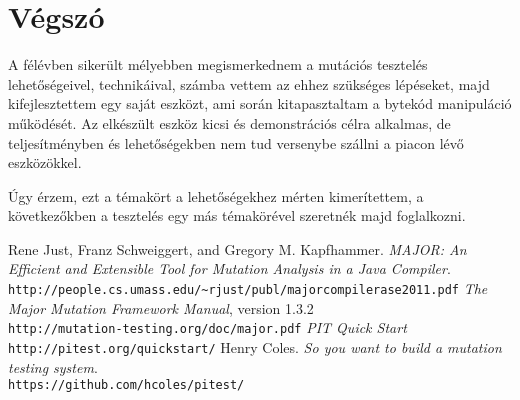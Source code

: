 \section{Végszó}
A félévben sikerült mélyebben megismerkednem a mutációs tesztelés lehetőségeivel, technikáival, számba vettem az ehhez szükséges lépéseket, majd kifejlesztettem egy saját eszközt, ami során kitapasztaltam a bytekód manipuláció működését. Az elkészült eszköz kicsi és demonstrációs célra alkalmas, de teljesítményben és lehetőségekben nem tud versenybe szállni a piacon lévő eszközökkel.

Úgy érzem, ezt a témakört a lehetőségekhez mérten kimerítettem, a következőkben a tesztelés egy más témakörével szeretnék majd foglalkozni.

\begin{thebibliography}{9}

Rene Just, Franz Schweiggert, and Gregory M. Kapfhammer. 
\textit{MAJOR: An Efficient and Extensible Tool for Mutation Analysis in a Java Compiler}. 
\\\texttt{http://people.cs.umass.edu/\textasciitilde rjust/publ/major\textunderscore compiler\textunderscore ase\textunderscore 2011.pdf}
\textit{The Major Mutation Framework Manual}, version 1.3.2 
\\\texttt{http://mutation-testing.org/doc/major.pdf}
\textit{PIT Quick Start}
\\\texttt{http://pitest.org/quickstart/}
Henry Coles. 
\textit{So you want to build a mutation testing system}. 
\\\texttt{https://github.com/hcoles/pitest/}



\end{thebibliography}